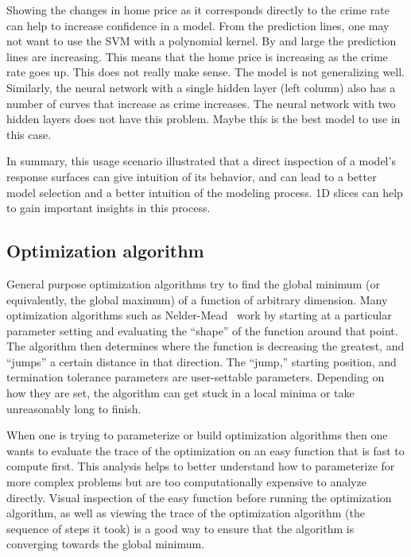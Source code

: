 Showing the changes in home price as it corresponds directly to the crime rate
can help to increase confidence in a model.  From the prediction lines, one may
not want to use the SVM with a polynomial kernel. By and large the prediction
lines are increasing. This means that the home price is increasing as the crime
rate goes up. This does not really make sense. The model is not generalizing
well. Similarly, the neural network with a single hidden layer (left column)
also has a number of curves that increase as crime increases. The neural
network with two hidden layers does not have this problem. Maybe this is the
best model to use in this case.

In summary, this usage scenario illustrated that a direct inspection of a
model's response surfaces can give intuition of its behavior, and can lead to a
better model selection and a better intuition of the modeling process. 1D
slices can help to gain important insights in this process. 

\subsection{Optimization algorithm}
\label{sec:optimization}

General purpose optimization algorithms try to find the global minimum (or
equivalently, the global maximum) of a function of arbitrary dimension.  Many
optimization algorithms such as Nelder-Mead~\cite{Nelder:1965} work by starting
at a particular parameter setting and evaluating the ``shape'' of the function
around that point.  The algorithm then determines where the function is
decreasing the greatest, and ``jumps'' a certain distance in that direction.
The ``jump,'' starting position, and termination tolerance parameters are
user-settable parameters. Depending on how they are set, the algorithm can get
stuck in a local minima or take unreasonably long to finish.

When one is trying to parameterize or build optimization algorithms then
one wants to evaluate the trace of the optimization on an easy function
that is fast to compute first. This analysis helps to better understand how to parameterize for more complex problems
but are
too computationally expensive to analyze directly. 
Visual inspection of the easy function before running the optimization algorithm, as well as
viewing the trace of the optimization algorithm (the sequence of steps it took) is a good way to ensure that the algorithm is converging towards the global
minimum. 

